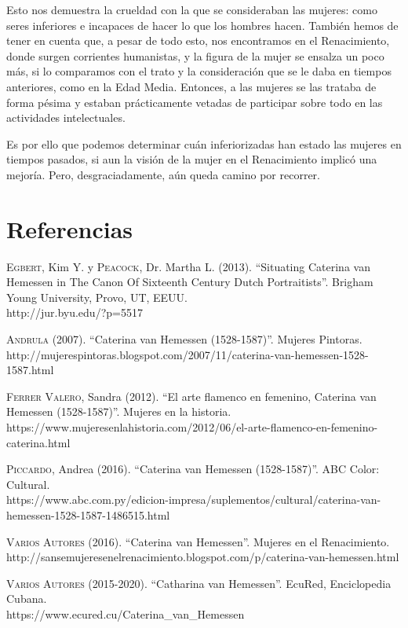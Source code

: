 \documentclass[12pt]{book}
\begin{document}
Esto nos demuestra la crueldad con la que se consideraban las mujeres: como seres inferiores e incapaces de hacer lo que los hombres hacen. También hemos de tener en cuenta que, a pesar de todo esto, nos encontramos en el Renacimiento, donde surgen corrientes humanistas, y la figura de la mujer se ensalza un poco más, si lo comparamos con el trato y la consideración que se le daba en tiempos anteriores, como en la Edad Media. Entonces, a las mujeres se las trataba de forma pésima y estaban prácticamente vetadas de participar sobre todo en las actividades intelectuales.\bigskip

Es por ello que podemos determinar cuán inferiorizadas han estado las mujeres en tiempos pasados, si aun la visión de la mujer en el Renacimiento implicó una mejoría. Pero, desgraciadamente, aún queda camino por recorrer.

\chapter{Referencias}

\textsc{Egbert}, Kim Y. y \textsc{Peacock}, Dr. Martha L. (2013). ``Situating Caterina van Hemessen in The Canon Of Sixteenth Century Dutch Portraitists''. Brigham Young University, Provo, UT, EEUU.\\
http://jur.byu.edu/?p=5517\bigskip

\textsc{Andrula} (2007). ``Caterina van Hemessen (1528-1587)''. Mujeres Pintoras.\\
http://mujerespintoras.blogspot.com/2007/11/caterina-van-hemessen-1528-1587.html\bigskip

\textsc{Ferrer Valero}, Sandra (2012). ``El arte flamenco en femenino, Caterina van Hemessen (1528-1587)''. Mujeres en la historia.\\
https://www.mujeresenlahistoria.com/2012/06/el-arte-flamenco-en-femenino-caterina.html\bigskip

\textsc{Piccardo}, Andrea (2016). ``Caterina van Hemessen (1528-1587)''. ABC Color: Cultural.\\
https://www.abc.com.py/edicion-impresa/suplementos/cultural/caterina-van-hemessen-1528-1587-1486515.html\bigskip

\textsc{Varios Autores} (2016). ``Caterina van Hemessen''. Mujeres en el Renacimiento.\\
http://sansemujeresenelrenacimiento.blogspot.com/p/caterina-van-hemessen.html\bigskip

\textsc{Varios Autores} (2015-2020). ``Catharina van Hemessen''. EcuRed, Enciclopedia Cubana.\\
https://www.ecured.cu/Caterina_van_Hemessen\bigskip
\end{document}
